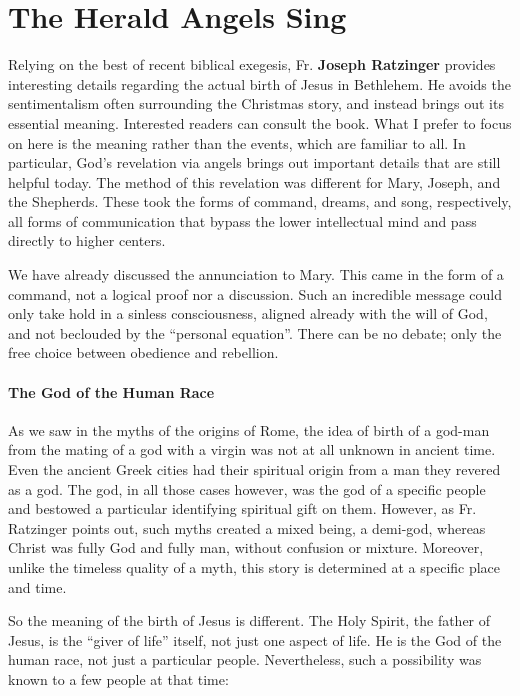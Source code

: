\section{The Herald Angels Sing}

Relying on the best of recent biblical exegesis, Fr. \textbf{Joseph Ratzinger} provides interesting details regarding the actual birth of Jesus in Bethlehem. He avoids the sentimentalism often surrounding the Christmas story, and instead brings out its essential meaning. Interested readers can consult the book. What I prefer to focus on here is the meaning rather than the events, which are familiar to all. In particular, God's revelation via angels brings out important details that are still helpful today. The method of this revelation was different for Mary, Joseph, and the Shepherds. These took the forms of command, dreams, and song, respectively, all forms of communication that bypass the lower intellectual mind and pass directly to higher centers.

We have already discussed the annunciation to Mary. This came in the form of a command, not a logical proof nor a discussion. Such an incredible message could only take hold in a sinless consciousness, aligned already with the will of God, and not beclouded by the “personal equation”. There can be no debate; only the free choice between obedience and rebellion.

\paragraph{The God of the Human Race}
As we saw in the myths of the origins of Rome, the idea of birth of a god-man from the mating of a god with a virgin was not at all unknown in ancient time. Even the ancient Greek cities had their spiritual origin from a man they revered as a god. The god, in all those cases however, was the god of a specific people and bestowed a particular identifying spiritual gift on them. However, as Fr. Ratzinger points out, such myths created a mixed being, a demi-god, whereas Christ was fully God and fully man, without confusion or mixture. Moreover, unlike the timeless quality of a myth, this story is determined at a specific place and time.

So the meaning of the birth of Jesus is different. The Holy Spirit, the father of Jesus, is the “giver of life” itself, not just one aspect of life. He is the God of the human race, not just a particular people. Nevertheless, such a possibility was known to a few people at that time:

